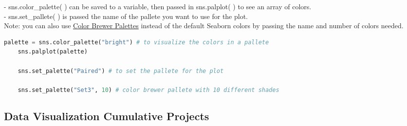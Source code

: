 \documentclass[11pt, a4paper]{article}
\begin{document}
\begin{spacing}{1.1}
	\hspace*{3mm} - sns.color\_palette( ) can be saved to a variable, then passed in sns.palplot( ) to see an array of colors. \\
	\hspace*{3mm} - sns.set\_pallete( ) is passed the name of the pallete you want to use for the plot. \vspace*{2mm} \\
	Note: you can also use \href{https://colorbrewer2.org/#type=sequential&scheme=BuGn&n=3}{Color Brewer Palettes} instead of the default Seaborn colors by passing the name and number of colors needed.
	\begin{lstlisting}[language=Python]
	palette = sns.color_palette("bright") # to visualize the colors in a pallete
	sns.palplot(palette) 
	
	sns.set_palette("Paired") # to set the pallete for the plot
	
	sns.set_palette("Set3", 10) # color brewer pallete with 10 different shades	\end{lstlisting} \newpage
	\subsection{Data Visualization Cumulative Projects}
	
	
	
	 
\end{spacing}
\end{document}
